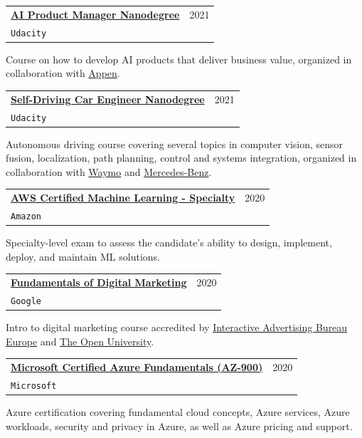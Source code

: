 \documentclass[letterpaper,11pt]{article}
\makeatletter
\newcommand{\resumeSubheading}[4]{
  \vspace{-2pt}\item
    \begin{tabular*}{0.97\textwidth}[t]{l@{\extracolsep{\fill}}r}
      \textbf{#1} & #2 \\
      \texttt{\small#3} & \textit{\small #4} \\
    \end{tabular*}\vspace{-7pt}
}
\makeatother
\begin{document}
    \vspace{2mm}
    \resumeSubheading
      {\href{https://www.udacity.com/course/ai-product-manager-nanodegree--nd088}{AI Product Manager Nanodegree}}{2021}
      {Udacity}{}
    \vspace{2mm}
    
    Course on how to develop AI products that deliver business value, organized in collaboration with \href{https://appen.com/}{Appen}.
    
    \vspace{2mm}
    \resumeSubheading
      {\href{https://www.udacity.com/course/self-driving-car-engineer-nanodegree--nd013}{Self-Driving Car Engineer Nanodegree}}{2021}
      {Udacity}{}
    \vspace{2mm}
    
    Autonomous driving course covering several topics in computer vision, sensor fusion, localization, path planning, control and systems integration, organized in collaboration with \href{https://waymo.com/}{Waymo} and \href{https://www.mercedes-benz.com/en/innovation/autonomous/}{Mercedes-Benz}.
    
    \resumeSubheading
      {\href{https://aws.amazon.com/certification/certified-machine-learning-specialty/}{AWS Certified Machine Learning - Specialty}}{2020}
      {Amazon}{}
    \vspace{2mm}
    
    Specialty-level exam to assess the candidate's ability to design, implement, deploy, and maintain ML solutions.
    
    \vspace{2mm}
    \resumeSubheading
      {\href{https://learndigital.withgoogle.com/digitalgarage/course/digital-marketing}{Fundamentals of Digital Marketing}}{2020}
      {Google}{}
    \vspace{2mm}
    
    Intro to digital marketing course accredited by \href{https://iabeurope.eu/0}{Interactive Advertising Bureau Europe} and \href{https://www.open.ac.uk/}{The Open University}.
    
    \vspace{2mm}
    \resumeSubheading
      {\href{https://docs.microsoft.com/en-us/learn/certifications/azure-fundamentals/}{Microsoft Certified Azure Fundamentals (AZ-900)}}{2020}
      {Microsoft}{}
    \vspace{2mm}
    
    Azure certification covering fundamental cloud concepts, Azure services, Azure workloads, security and privacy in Azure, as well as Azure pricing and support.
    
\end{document}
